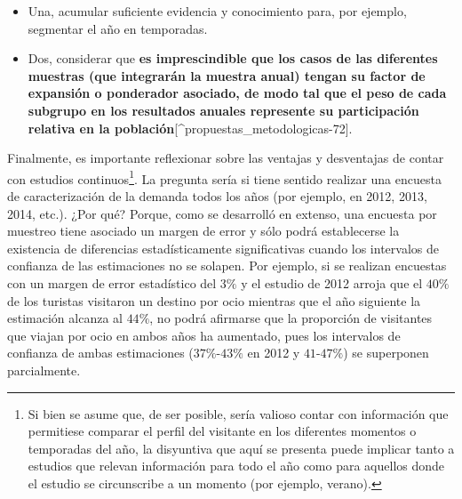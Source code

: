 \documentclass[
]{book}
\begin{document}
\begin{itemize}
\item
  Una, acumular suficiente evidencia y conocimiento para, por ejemplo, segmentar el año en temporadas.
\item
  Dos, considerar que \textbf{es imprescindible que los casos de las diferentes muestras (que integrarán la muestra anual) tengan su factor de expansión o ponderador asociado, de modo tal que el peso de cada subgrupo en los resultados anuales represente su participación relativa en la población}{[}\^{}propuestas\_metodologicas-72{]}.
\end{itemize}

Finalmente, es importante reflexionar sobre las ventajas y desventajas de contar con estudios continuos\footnote{Si bien se asume que, de ser posible, sería valioso contar con información que permitiese comparar el perfil del visitante en los diferentes momentos o temporadas del año, la disyuntiva que aquí se presenta puede implicar tanto a estudios que relevan información para todo el año como para aquellos donde el estudio se circunscribe a un momento (por ejemplo, verano).}. La pregunta sería si tiene sentido realizar una encuesta de caracterización de la demanda todos los años (por ejemplo, en 2012, 2013, 2014, etc.). ¿Por qué? Porque, como se desarrolló en extenso, una encuesta por muestreo tiene asociado un margen de error y sólo podrá establecerse la existencia de diferencias estadísticamente significativas cuando los intervalos de confianza de las estimaciones no se solapen. Por ejemplo, si se realizan encuestas con un margen de error estadístico del \(3\%\) y el estudio de 2012 arroja que el \(40\%\) de los turistas visitaron un destino por ocio mientras que el año siguiente la estimación alcanza al \(44\%\), no podrá afirmarse que la proporción de visitantes que viajan por ocio en ambos años ha aumentado, pues los intervalos de confianza de ambas estimaciones (\(37\%\)-\(43\%\) en 2012 y \(41%
\)-\(47\%\)) se superponen parcialmente.
\end{document}
